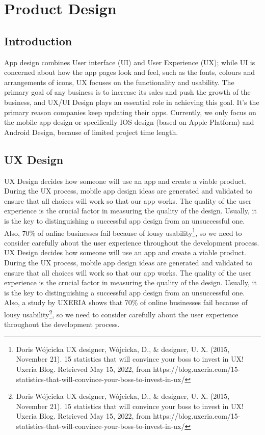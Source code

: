 \chapter{Product Design} %
\label{Chapter2} %

\section{Introduction}
App design combines User interface (UI) and User Experience (UX); while UI is concerned about how the app pages look and feel, such as the fonts, colours and arrangements of icons, UX focuses on the functionality and usability. The primary goal of any business is to increase its sales and push the growth of the business, and UX/UI Design plays an essential role in achieving this goal. It's the primary reason companies keep updating their apps. Currently, we only focus on the mobile app design or specifically IOS design (based on Apple Platform) and Android Design, because of limited project time length.
\section{UX Design}
UX Design decides how someone will use an app and create a viable product. 
During the UX process, mobile app design ideas are generated and validated to ensure that all choices will work so that our app works. 
The quality of the user experience is the crucial factor in measuring the quality of the design. 
Usually, it is the key to distinguishing a successful app design from an unsuccessful one. 
Also, 70\% of online businesses fail because of lousy usability\footnote{Doris Wójcicka UX designer, Wójcicka, D., \& designer, U. X. (2015, November 21). 15 statistics that will convince your boss to invest in UX! Uxeria Blog. Retrieved May 15, 2022, from https://blog.uxeria.com/15-statistics-that-will-convince-your-boss-to-invest-in-ux/ }, so we need to consider carefully about the user experience throughout the development process.
UX Design decides how someone will use an app and create a viable product. During the UX process, mobile app design ideas are generated and validated to ensure that all choices will work so that our app works. The quality of the user experience is the crucial factor in measuring the quality of the design. Usually, it is the key to distinguishing a successful app design from an unsuccessful one. Also, a study by UXERIA shows that 70\% of online businesses fail because of lousy usability\footnote{Doris Wójcicka UX designer, Wójcicka, D., \& designer, U. X. (2015, November 21). 15 statistics that will convince your boss to invest in UX! Uxeria Blog. Retrieved May 15, 2022, from https://blog.uxeria.com/15-statistics-that-will-convince-your-boss-to-invest-in-ux/ }, so we need to consider carefully about the user experience throughout the development process.
